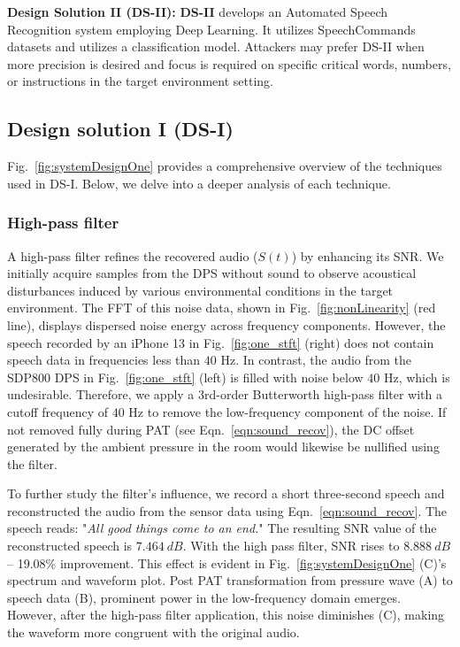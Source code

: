 \textbf{Design Solution II (DS-II):}  \textbf{DS-II} develops an Automated Speech Recognition system employing Deep Learning. It utilizes SpeechCommands datasets and utilizes a classification model.
{Attackers may prefer DS-II when more precision is desired and focus is required on specific critical words, numbers, or instructions in the target environment setting.}

\subsection{Design solution I (DS-I)}
\label{subsection:DS-1}
Fig.~\ref{fig:systemDesignOne} provides a comprehensive overview of the techniques used in DS-I. 
Below, we delve into a deeper analysis of each technique. 



\subsubsection{\textbf{High-pass filter}} 
A high-pass filter refines the recovered audio ($S(t)$) by enhancing its SNR. 
We initially acquire samples from the DPS without sound to observe acoustical disturbances induced by various environmental conditions in the target environment.
The FFT of this noise data, shown in Fig.~\ref{fig:nonLinearity} (red line), displays dispersed noise energy across frequency components. 
However, the speech recorded by an iPhone 13 in Fig.~\ref{fig:one_stft} (right) does not contain speech data in frequencies less than $40$ Hz. 
In contrast, the audio from the SDP800 DPS in Fig.~\ref{fig:one_stft} (left) is filled with noise below $40$ Hz, which is undesirable. 
Therefore, we apply a 3rd-order Butterworth high-pass filter with a cutoff frequency of $40$ Hz to remove the low-frequency component of the noise.
If not removed fully during PAT (see Eqn.~\ref{eqn:sound_recov}), the DC offset generated by the ambient pressure in the room would likewise be nullified using the filter. 

To further study the filter's influence,  we record a short three-second speech and reconstructed the audio from the sensor data using Eqn.~\ref{eqn:sound_recov}.
The speech reads: "\textit{All good things come to an end.}" 
The resulting SNR value of the reconstructed speech is $7.464~dB$. With the high pass filter, SNR rises to $8.888~dB$ -- 19.08\% improvement.
This effect is evident in Fig.~\ref{fig:systemDesignOne} (C)'s spectrum and waveform plot. 
Post PAT transformation from pressure wave (A) to speech data (B), prominent power in the low-frequency domain emerges. However, after the high-pass filter application, this noise diminishes (C), making the waveform more congruent with the original audio.

